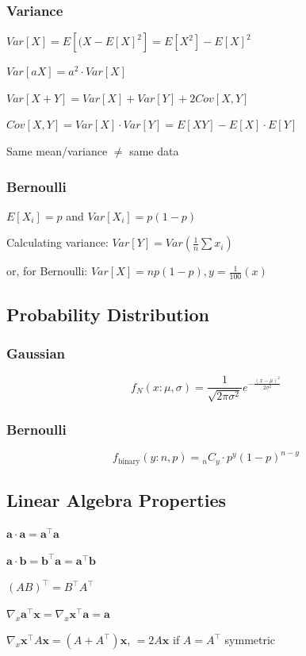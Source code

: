 \documentclass[8pt]{extarticle}
\begin{document}
\subsubsection*{Variance}
$Var[X] = E[(X-E[X]^2] = E[X^2] - E[X]^2$\par
$Var[aX] = a^2 \cdot Var[X]$\par
$Var[X+Y] = Var[X] + Var[Y] + 2 Cov[X, Y]$\par
$Cov[X, Y] = Var[X] \cdot Var[Y] = E[XY] - E[X]\cdot E[Y]$\par

Same mean/variance $\neq$ same data

\subsubsection*{Bernoulli}
$E[X_i] = p$ and $Var[X_i]=p(1-p)$\par
Calculating variance: $Var[Y]=Var(\frac{1}{n}\sum{x_i})$\par
or, for Bernoulli: $Var[X]=np(1-p), y=\frac{1}{100}(x)$\par
\hline


\subsection*{Probability Distribution}
\subsubsection*{Gaussian}
$$ f_N(x:\mu, \sigma)=\frac{1}{\sqrt{2\pi\sigma^2}}e^{-\frac{(x-\mu)^2}{2\sigma^2}} $$
\subsubsection*{Bernoulli}
$$ f_{\mbox{binary}} (y:n, p) = {_nC_y} \cdot p^y(1-p)^{n-y} $$ 
\hline

\subsection*{Linear Algebra Properties}
\begin{multicols}{2}
$\mathbf{a}\cdot \mathbf{a} = \mathbf{a}^\top \mathbf{a}$\par
$\mathbf{a}\cdot \mathbf{b} = \mathbf{b}^\top \mathbf{a} = \mathbf{a}^\top \mathbf{b}$\par
$(AB)^\top = B^\top A^\top$ \par
$\nabla_x \mathbf{a}^\top \mathbf{x} = \nabla_x \mathbf{x}^\top \mathbf{a} =\mathbf{a} $ \par
$\nabla_x \mathbf{x}^\top A\mathbf{x} = (A+A^\top)\mathbf{x}$, $=2A\mathbf{x}$ if $A=A^\top$ symmetric 
\end{multicols}
\end{document}
